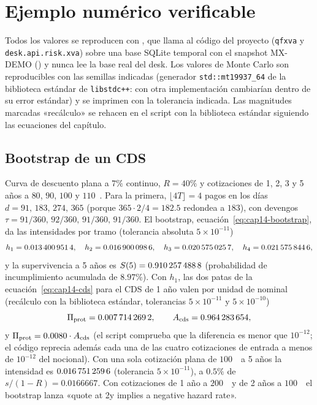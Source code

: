 \section{Ejemplo numérico verificable}\label{sec:cap14-ejemplo}

Todos los valores se reproducen con , que llama al código del
proyecto (\texttt{qfxva} y \texttt{desk.api.risk.xva}) sobre una base SQLite temporal con el snapshot MX-DEMO
() y nunca lee la base real del desk. Los valores de Monte Carlo son
reproducibles con las semillas indicadas (generador \texttt{std::mt19937\_64} de la biblioteca estándar de \texttt{libstdc++}:
con otra implementación cambiarían dentro de su error estándar) y se imprimen con la tolerancia indicada. Las
magnitudes marcadas «recálculo» se rehacen en el script con la biblioteca estándar siguiendo las ecuaciones del
capítulo.

\subsection{Bootstrap de un CDS}\label{sec:cap14-ej-cds}

Curva de descuento plana a $7\%$ continuo, $R=40\%$ y cotizaciones de 1, 2, 3 y 5 años a $80$, $90$, $100$ y $110$~\pb.
Para la primera, $\lfloor4T\rfloor=4$ pagos en los días $d=91,\,183,\,274,\,365$ (porque $365\cdot2/4=182.5$ redondea a
$183$), con devengos $\tau=91/360,\,92/360,\,91/360,\,91/360$. El bootstrap, ecuación~\eqref{eq:cap14-bootstrap},
da las intensidades por tramo (tolerancia absoluta $5\times10^{-11}$)
\[
  h_1=\verif{cap14-cds-lambda-1}{0.0134009514},\quad
  h_2=\verif{cap14-cds-lambda-2}{0.0169000986},\quad
  h_3=\verif{cap14-cds-lambda-3}{0.0205750257},\quad
  h_4=\verif{cap14-cds-lambda-4}{0.0215758446},
\]
y la supervivencia a 5 años es $S(5)=\verif{cap14-cds-supervivencia-5a}{0.9102574888}$ (probabilidad de
incumplimiento acumulada de $8.97\%$). Con $h_1$, las dos patas de la ecuación~\eqref{eq:cap14-cds} para el CDS de
1 año valen por unidad de nominal (recálculo con la biblioteca estándar, tolerancias $5\times10^{-11}$ y
$5\times10^{-10}$)
\[
  \Pi_{\mathrm{prot}}=\verif{cap14-cds-proteccion-1a}{0.0077142692},\qquad
  \Ann_{\mathrm{cds}}=\verif{cap14-cds-anualidad-1a}{0.964283654},
\]
y $\Pi_{\mathrm{prot}}=0.0080\cdot\Ann_{\mathrm{cds}}$ (el script comprueba que la diferencia es menor que
$10^{-12}$; el código reprecia además cada una de las cuatro cotizaciones de entrada a menos de $10^{-12}$ del nocional).
Con una sola cotización plana de $100$~\pb\ a 5 años la intensidad es $\verif{cap14-cds-lambda-plana}{0.0167512596}$
(tolerancia $5\times10^{-11}$), a $0.5\%$ de $s/(1-R)=0.0166667$. Con cotizaciones de 1 año a $200$~\pb\ y de 2 años a
$100$~\pb\ el bootstrap lanza «quote at 2y implies a negative hazard rate».

